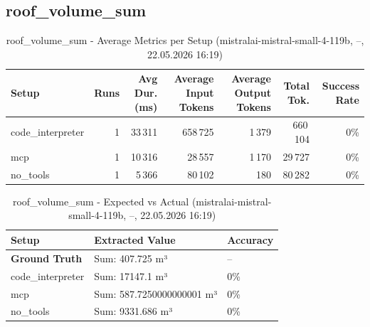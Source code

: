 \documentclass[a4paper,11pt]{article}
\begin{document}
\clearpage

\subsection{roof\_volume\_sum}

\begin{table}[H]
\centering
\scriptsize
\caption{roof\_volume\_sum - Average Metrics per Setup (mistralai-mistral-small-4-119b, --, 22.05.2026 16:19)}
\label{tab:combined\_roof\_volume\_sum\_metrics\_20260522}
\begin{tabular}{l r r r r r r}
\toprule
Setup & Runs & Avg Dur. (ms) & Average Input Tokens & Average Output Tokens & Total Tok. & Success Rate \\
\midrule
code\_interpreter & 1 & 33\,311 & 658\,725 & 1\,379 & 660\,104 & 0\% \\
mcp & 1 & 10\,316 & 28\,557 & 1\,170 & 29\,727 & 0\% \\
no\_tools & 1 & 5\,366 & 80\,102 & 180 & 80\,282 & 0\% \\
\bottomrule
\end{tabular}
\end{table}

\begin{table}[H]
\centering
\scriptsize
\caption{roof\_volume\_sum - Detailed Runs Comparison (mistralai-mistral-small-4-119b, --, 22.05.2026 16:19)}
\end{table}

\begin{table}[H]
\centering
\scriptsize
\caption{roof\_volume\_sum - Expected vs Actual (mistralai-mistral-small-4-119b, --, 22.05.2026 16:19)}
\begin{tabular}{l l l}
\toprule
Setup & Extracted Value & Accuracy \\
\midrule
\textbf{Ground Truth} & Sum: 407.725 m³ & -- \\
\midrule
code\_interpreter & Sum: 17147.1 m³ & 0\% \\
mcp & Sum: 587.7250000000001 m³ & 0\% \\
no\_tools & Sum: 9331.686 m³ & 0\% \\
\bottomrule
\end{tabular}
\end{table}
\end{document}
